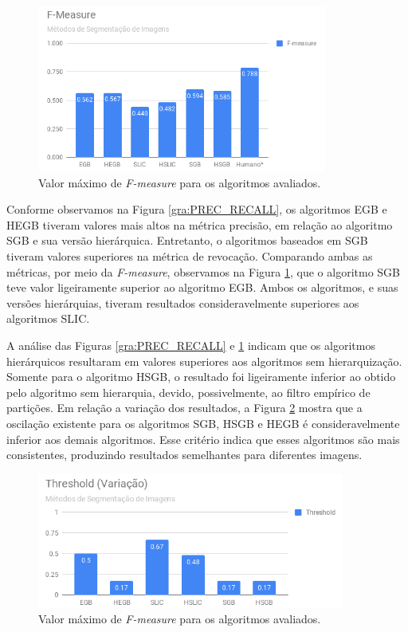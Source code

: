 \begin{document}
\begin{figure}[ht]
\centering
\includegraphics[width=0.85\textwidth]{graph_fmeasure.png}
\caption{Valor máximo de \textit{F-measure} para os algoritmos avaliados.}
\label{gra:FMEASURE}
\end{figure}

Conforme observamos na Figura \ref{gra:PREC_RECALL}, os algoritmos EGB e HEGB tiveram valores mais altos na métrica precisão, em relação ao algoritmo SGB e sua versão hierárquica. Entretanto, o algoritmos baseados em SGB tiveram valores superiores na métrica de revocação. Comparando ambas as métricas, por meio da \textit{F-measure}, observamos na Figura \ref{gra:FMEASURE}, que o algoritmo SGB teve valor ligeiramente superior ao algoritmo EGB. Ambos os algoritmos, e suas versões hierárquias, tiveram resultados consideravelmente superiores aos algoritmos SLIC.

A análise das Figuras \ref{gra:PREC_RECALL} e \ref{gra:FMEASURE} indicam que os algoritmos hierárquicos resultaram em valores superiores aos algoritmos sem hierarquização. Somente para o algoritmo HSGB, o resultado foi ligeiramente inferior ao obtido pelo algoritmo sem hierarquia, devido, possivelmente, ao filtro empírico de partições. Em relação a variação dos resultados, a Figura \ref{gra:THRESHOLD} mostra que a oscilação existente para os algoritmos SGB, HSGB e HEGB é consideravelmente inferior aos demais algoritmos. Esse critério indica que esses algoritmos são mais consistentes, produzindo resultados semelhantes para diferentes imagens.

\begin{figure}[ht]
\centering
\includegraphics[width=0.9\textwidth]{graph_threshold.png}
\caption{Valor máximo de \textit{F-measure} para os algoritmos avaliados.}
\label{gra:THRESHOLD}
\end{figure}
\end{document}
